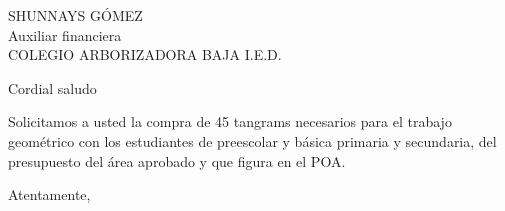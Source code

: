 \documentclass[letterpaper,spanish]{letter}
\date{21 de noviembre de 2016}
\begin{document}
\begin{letter}{SHUNNAYS GÓMEZ\\Auxiliar financiera\\COLEGIO ARBORIZADORA BAJA I.E.D.}
	
\opening{Cordial saludo}
Solicitamos a usted la compra de 45 tangrams necesarios para el trabajo geométrico con los estudiantes de preescolar y básica primaria y secundaria, del presupuesto del área aprobado y que figura en el POA.
\closing{Atentamente,}


\end{letter}
\end{document}
